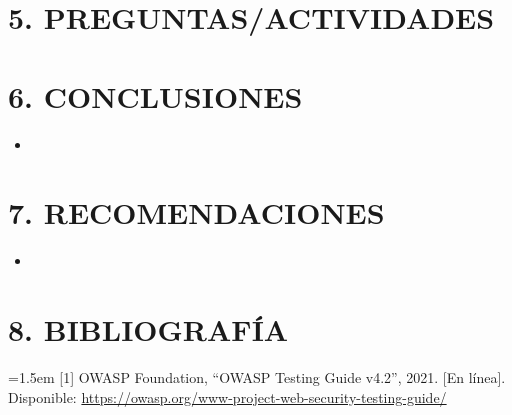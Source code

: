 \documentclass[12pt, a4paper]{article}
\begin{document}
\section*{5. PREGUNTAS/ACTIVIDADES}

\section*{6. CONCLUSIONES}

\begin{itemize}[leftmargin=*]
    \item 
\end{itemize}

\section*{7. RECOMENDACIONES}

\begin{itemize}[leftmargin=*]
    \item 
\end{itemize}

\section*{8. BIBLIOGRAFÍA}

\noindent\hangindent=1.5em
[1] OWASP Foundation, ``OWASP Testing Guide v4.2'', 2021. [En línea]. Disponible: \url{https://owasp.org/www-project-web-security-testing-guide/}
\end{document}
